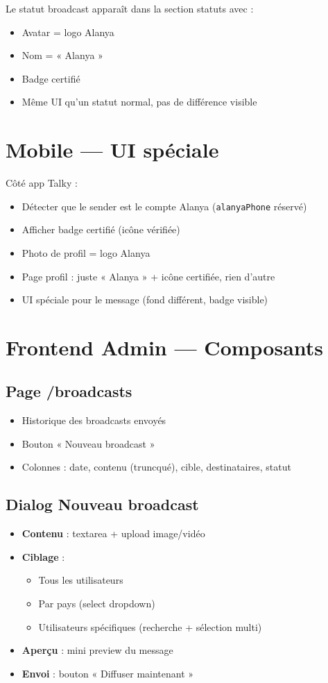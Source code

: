 \documentclass{article}
\begin{document}
Le statut broadcast apparaît dans la section statuts avec :
\begin{itemize}
    \item Avatar = logo Alanya
    \item Nom = « Alanya »
    \item Badge certifié
    \item Même UI qu'un statut normal, pas de différence visible
\end{itemize}

\section{Mobile --- UI spéciale}

Côté app Talky :
\begin{itemize}
    \item Détecter que le sender est le compte Alanya (\texttt{alanyaPhone} réservé)
    \item Afficher badge certifié (icône vérifiée)
    \item Photo de profil = logo Alanya
    \item Page profil : juste « Alanya » + icône certifiée, rien d'autre
    \item UI spéciale pour le message (fond différent, badge visible)
\end{itemize}

\section{Frontend Admin --- Composants}

\subsection{Page /broadcasts}
\begin{itemize}
    \item Historique des broadcasts envoyés
    \item Bouton « Nouveau broadcast »
    \item Colonnes : date, contenu (truncqué), cible, destinataires, statut
\end{itemize}

\subsection{Dialog Nouveau broadcast}
\begin{itemize}
    \item \textbf{Contenu} : textarea + upload image/vidéo
    \item \textbf{Ciblage} :
    \begin{itemize}
        \item Tous les utilisateurs
        \item Par pays (select dropdown)
        \item Utilisateurs spécifiques (recherche + sélection multi)
    \end{itemize}
    \item \textbf{Aperçu} : mini preview du message
    \item \textbf{Envoi} : bouton « Diffuser maintenant »
\end{itemize}
\end{document}
